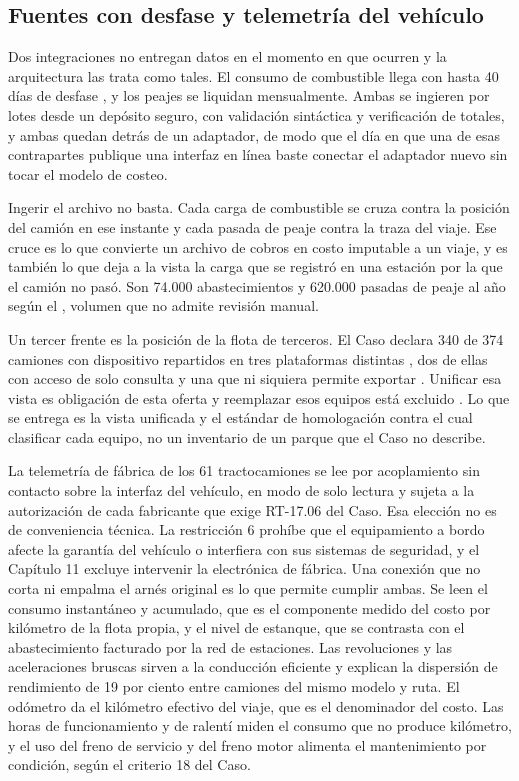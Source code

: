 \subsection{Fuentes con desfase y telemetría del vehículo}\label{sec:4-desfase}

Dos integraciones no entregan datos en el momento en que ocurren y la arquitectura las trata como
tales. El consumo de combustible llega con hasta 40 días de desfase , y los
peajes se liquidan mensualmente. Ambas se ingieren por lotes desde un depósito seguro, con validación
sintáctica y verificación de totales, y ambas quedan detrás de un adaptador, de modo que el día en que
una de esas contrapartes publique una interfaz en línea baste conectar el adaptador nuevo sin tocar el
modelo de costeo.

Ingerir el archivo no basta. Cada carga de combustible se cruza contra la posición del camión en ese
instante y cada pasada de peaje contra la traza del viaje. Ese cruce es lo que convierte un archivo de
cobros en costo imputable a un viaje, y es también lo que deja a la vista la carga que se registró en
una estación por la que el camión no pasó. Son 74.000 abastecimientos y 620.000 pasadas de peaje al año
según el , volumen que no admite revisión manual.

Un tercer frente es la posición de la flota de terceros. El Caso declara 340 de 374 camiones con
dispositivo repartidos en tres plataformas distintas , dos de ellas con acceso
de solo consulta y una que ni siquiera permite exportar . Unificar esa vista es
obligación de esta oferta y reemplazar esos equipos está excluido . Lo que se
entrega es la vista unificada y el estándar de homologación contra el cual clasificar cada equipo, no
un inventario de un parque que el Caso no describe.

La telemetría de fábrica de los 61 tractocamiones se lee por acoplamiento sin contacto sobre la
interfaz del vehículo, en modo de solo lectura y sujeta a la autorización de cada fabricante que exige
RT-17.06 del Caso. Esa elección no es de conveniencia técnica. La restricción 6 prohíbe que el
equipamiento a bordo afecte la garantía del vehículo o interfiera con sus sistemas de seguridad, y el
Capítulo 11 excluye intervenir la electrónica de fábrica. Una conexión que no corta ni empalma el arnés
original es lo que permite cumplir ambas. Se leen el consumo instantáneo y acumulado, que es
el componente medido del costo por kilómetro de la flota propia, y el nivel de estanque, que se
contrasta con el abastecimiento facturado por la red de estaciones. Las revoluciones y las aceleraciones
bruscas sirven a la conducción eficiente y explican la dispersión de rendimiento de 19 por ciento entre
camiones del mismo modelo y ruta. El odómetro da el kilómetro efectivo del viaje, que es el denominador
del costo. Las horas de funcionamiento y de ralentí miden el consumo que no produce kilómetro, y el uso
del freno de servicio y del freno motor alimenta el mantenimiento por condición, según el criterio 18
del Caso.

